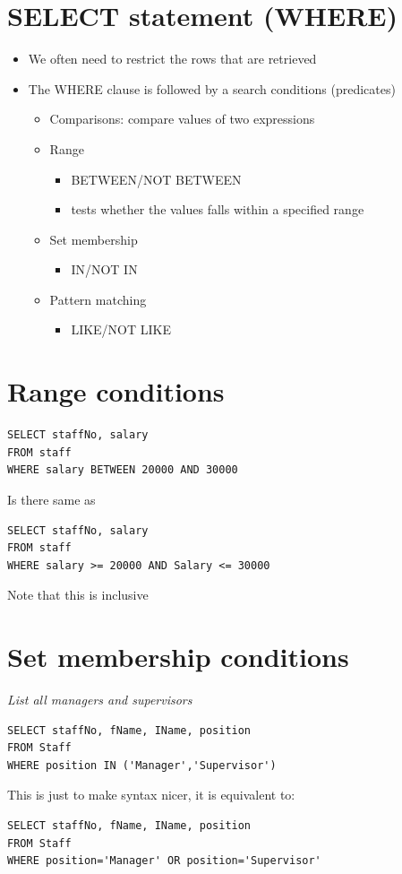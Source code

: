 \documentclass{article}[18pt]
\begin{document}
\section{SELECT statement (WHERE)}
\begin{itemize}
	\item We often need to restrict the rows that are retrieved
	\item The WHERE clause is followed by a search conditions (predicates)
	\begin{itemize}
		\item Comparisons: compare values of two expressions
		\item Range
		\begin{itemize}
			\item BETWEEN/NOT BETWEEN
			\item tests whether the values falls within a specified range
		\end{itemize}
		\item Set membership
		\begin{itemize}
			\item IN/NOT IN
		\end{itemize}
		\item Pattern matching
		\begin{itemize}
			\item LIKE/NOT LIKE
		\end{itemize}
	\end{itemize}
\end{itemize}
\section{Range conditions}
\begin{verbatim}
SELECT staffNo, salary
FROM staff
WHERE salary BETWEEN 20000 AND 30000
\end{verbatim}
Is there same as
\begin{verbatim}
SELECT staffNo, salary
FROM staff
WHERE salary >= 20000 AND Salary <= 30000
\end{verbatim}
Note that this is inclusive
\section{Set membership conditions}
\textit{List all managers and supervisors}
\begin{verbatim}
SELECT staffNo, fName, IName, position
FROM Staff
WHERE position IN ('Manager','Supervisor')
\end{verbatim}
This is just to make syntax nicer, it is equivalent to:
\begin{verbatim}
SELECT staffNo, fName, IName, position
FROM Staff
WHERE position='Manager' OR position='Supervisor'
\end{verbatim}
\end{document}
